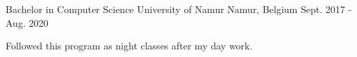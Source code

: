 

\begin{cventries}

  \cventry
    {Bachelor in Computer Science}
    {University of Namur}
    {Namur, Belgium}
    {Sept. 2017 - Aug. 2020}
    {
      \begin{cvitems}
        \item {
          Followed this program as night classes after my day work. 
        }
      \end{cvitems}
    }

\end{cventries}
